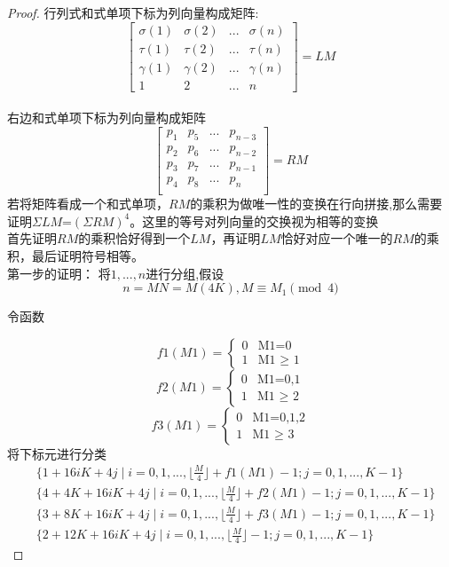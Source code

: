 \documentclass[twoside,a4paper,CCT]{cctart}   %
\begin{document}
\begin{proof}
行列式和式单项下标为列向量构成矩阵:
\begin{equation}\begin{bmatrix}\sigma(1)&\sigma(2)&...&\sigma(n)\\\tau(1)&\tau(2)&...&\tau(n)\\\gamma(1)&\gamma(2)&...&\gamma(n)\\
1&2&...&n\end{bmatrix}=LM\end{equation}\\
右边和式单项下标为列向量构成矩阵\begin{equation}\begin{bmatrix}p_{1}&p_{5}&...&p_{n-3}\\p_{2}&p_{6}&...&p_{n-2}\\p_{3}&p_{7}&...&p_{n-1}\\p_{4}&p_{8}&...&p_{n}\\\end{bmatrix}=RM\end{equation}
若将矩阵看成一个和式单项，$RM$的乘积为做唯一性的变换在行向拼接,那么需要证明$\Sigma LM$=$(\Sigma RM)^{4}$。这里的等号对列向量的交换视为相等的变换\\
首先证明$RM$的乘积恰好得到一个$LM$，再证明$LM$恰好对应一个唯一的$RM$的乘积，最后证明符号相等。\\
第一步的证明：
将$1,...,n$进行分组,假设$$n=MN=M(4K),M \equiv M_{1} \pmod{4} $$

令函数

$$f1(M1)=
\begin{cases}
0& \text{M1=0}\\
1& \text{M1 $\geq$ 1}
\end{cases}$$
$$f2(M1)=
\begin{cases}
0& \text{M1=0,1}\\
1& \text{M1 $\geq$ 2}
\end{cases}$$
$$f3(M1)=
\begin{cases}
0& \text{M1=0,1,2}\\
1& \text{M1 $\geq$ 3}
\end{cases}$$
将下标元进行分类
\begin{equation}\label{2}
\begin{split}
&
\{1+16iK+4j \mid
i=0,1,...,\lfloor \frac{M}{4} \rfloor + f1(M1) -1;
j=0,1,...,K-1\} \\
& \{4+4K+16iK+4j \mid
i=0,1,...,\lfloor \frac{M}{4} \rfloor + f2(M1) -1;
j=0,1,...,K-1\} \\
&
\{3+8K+16iK+4j \mid
i=0,1,...,\lfloor \frac{M}{4} \rfloor + f3(M1) -1;
j=0,1,...,K-1\} \\
&\{2+12K+16iK+4j \mid
i=0,1,...,\lfloor \frac{M}{4} \rfloor -1;
j=0,1,...,K-1\}
\end{split}
\end{equation}


\end{proof}
\end{document}
